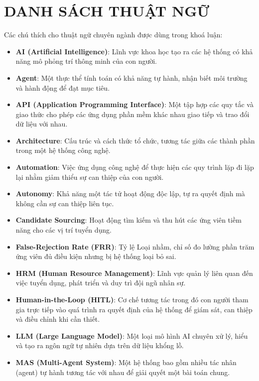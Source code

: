\documentclass{article}
\begin{document}
\cleardoublepage
{}
{}
\section*{DANH SÁCH THUẬT NGỮ}

\hspace{-1.5cm}Các chú thích cho thuật ngữ chuyên ngành được dùng trong khoá luận:

\begin{itemize}[topsep=0pt, itemsep=0pt, leftmargin=0pt]
    \item \textbf{AI (Artificial Intelligence)}: Lĩnh vực khoa học tạo ra các hệ thống có khả năng mô phỏng trí thông minh của con người.
    \item \textbf{Agent}: Một thực thể tính toán có khả năng tự hành, nhận biết môi trường và hành động để đạt mục tiêu.
    \item \textbf{API (Application Programming Interface)}: Một tập hợp các quy tắc và giao thức cho phép các ứng dụng phần mềm khác nhau giao tiếp và trao đổi dữ liệu với nhau.
    \item \textbf{Architecture}: Cấu trúc và cách thức tổ chức, tương tác giữa các thành phần trong một hệ thống công nghệ.
    \item \textbf{Automation}: Việc ứng dụng công nghệ để thực hiện các quy trình lặp đi lặp lại nhằm giảm thiểu sự can thiệp của con người.
    \item \textbf{Autonomy}: Khả năng một tác tử hoạt động độc lập, tự ra quyết định mà không cần sự can thiệp liên tục.
    \item \textbf{Candidate Sourcing}: Hoạt động tìm kiếm và thu hút các ứng viên tiềm năng cho các vị trí tuyển dụng.
    \item \textbf{False-Rejection Rate (FRR)}: Tỷ lệ Loại nhầm, chỉ số đo lường phần trăm ứng viên đủ điều kiện nhưng bị hệ thống loại bỏ sai.
    \item \textbf{HRM (Human Resource Management)}: Lĩnh vực quản lý liên quan đến việc tuyển dụng, phát triển và duy trì đội ngũ nhân sự.
    \item \textbf{Human-in-the-Loop (HITL)}: Cơ chế tương tác trong đó con người tham gia trực tiếp vào quá trình ra quyết định của hệ thống để giám sát, can thiệp và điều chỉnh khi cần thiết.
    \item \textbf{LLM (Large Language Model)}: Một loại mô hình AI chuyên xử lý, hiểu và tạo ra ngôn ngữ tự nhiên dựa trên dữ liệu khổng lồ.
    \item \textbf{MAS (Multi-Agent System)}: Một hệ thống bao gồm nhiều tác nhân (agent) tự hành tương tác với nhau để giải quyết một bài toán chung.

\end{itemize}
\end{document}

